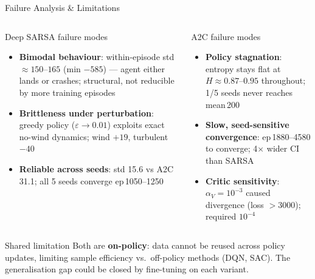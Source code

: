 \documentclass[aspectratio=169, 10pt]{beamer}
\begin{document}
\begin{frame}{Failure Analysis \& Limitations}
  \begin{columns}[T]
      \begin{block}{Deep SARSA failure modes}
        \begin{itemize}
          \item \textbf{Bimodal behaviour}: within-episode std
                $\approx\!150$--$165$ (min $-585$) --- agent either
                lands or crashes; structural, not reducible by more
                training episodes
          \item \textbf{Brittleness under perturbation}: greedy policy
                ($\varepsilon{\to}0.01$) exploits exact no-wind
                dynamics; wind $+19$, turbulent $-40$
          \item \textbf{Reliable across seeds}: std 15.6 vs A2C 31.1;
                all 5 seeds converge ep\,1050--1250
        \end{itemize}
      \end{block}
      \begin{block}{A2C failure modes}
        \begin{itemize}
          \item \textbf{Policy stagnation}: entropy stays flat at
                $H\!\approx\!0.87$--$0.95$ throughout; 1/5 seeds
                never reaches mean\,200
          \item \textbf{Slow, seed-sensitive convergence}: ep\,1880--4580
                to converge; 4$\times$ wider CI than SARSA
          \item \textbf{Critic sensitivity}: $\alpha_V = 10^{-3}$
                caused divergence (loss $>3000$); required $10^{-4}$
        \end{itemize}
      \end{block}
  \end{columns}
  \vspace{0.3em}
  \begin{alertblock}{Shared limitation}
    Both are \textbf{on-policy}: data cannot be reused across policy updates,
    limiting sample efficiency vs.\ off-policy methods (DQN, SAC). The
    generalisation gap could be closed by fine-tuning on each variant.
  \end{alertblock}
\end{frame}
\end{document}

